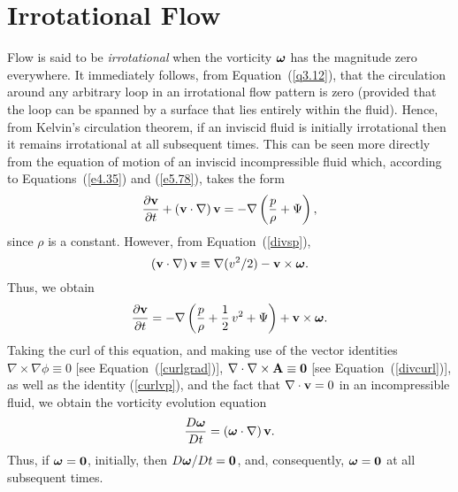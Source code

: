 \section{Irrotational Flow}\label{qirr}
Flow is said to be {\em irrotational}\/ when the vorticity $\mbox{\boldmath$\omega$}$ has the magnitude zero everywhere. 
It immediately follows, from Equation~(\ref{q3.12}), that the circulation around any arbitrary loop in an irrotational
flow pattern is zero (provided that the loop can be spanned by a surface that lies entirely within the fluid). Hence, from Kelvin's circulation theorem, if an inviscid fluid is initially irrotational
then it remains irrotational at all subsequent times. This can be seen more directly from the
equation of motion of an inviscid incompressible fluid which, according to  Equations~(\ref{e4.35}) and (\ref{e5.78}),  takes the
form
\begin{equation}
\frac{\partial{\bf v}}{\partial t} + ({\bf v}\cdot \nabla)\,{\bf v} = - \nabla\left(\frac{p}{\rho}+\Psi\right),
\end{equation}
since $\rho$ is a constant. However, from Equation~(\ref{divsp}), 
\begin{equation}
({\bf v}\cdot\nabla)\,{\bf v} \equiv \nabla(v^2/2) -{\bf v}\times \mbox{\boldmath$\omega$}.
\end{equation}
Thus, we obtain
\begin{equation}\label{eq3.24}
\frac{\partial {\bf v}}{\partial t} = -\nabla\left(\frac{p}{\rho}+\frac{1}{2}\,v^2+\Psi\right)+ {\bf v}\times \mbox{\boldmath$\omega$}.
\end{equation}
Taking the curl of this equation, and making use of the vector identities $\nabla\times \nabla\phi\equiv 0$ [see Equation~(\ref{curlgrad})], 
$\nabla\cdot\nabla\times {\bf A}\equiv {\bf 0}$ [see Equation~(\ref{divcurl})], as well as the identity (\ref{curlvp}), and the fact that $\nabla\cdot{\bf v}=0$
in an incompressible fluid, we obtain the vorticity evolution equation
\begin{equation}\label{eq3.25}
\frac{D{\mbox{\boldmath$\omega$}}}{Dt} = (\mbox{\boldmath$\omega$}\cdot\nabla)\,{\bf v}.
\end{equation}
Thus, if $\mbox{\boldmath$\omega$}={\bf 0}$, initially, then $D\mbox{\boldmath$\omega$}/Dt={\bf 0}$, and, consequently, $\mbox{\boldmath$\omega$}={\bf 0}$  at all subsequent times. 

